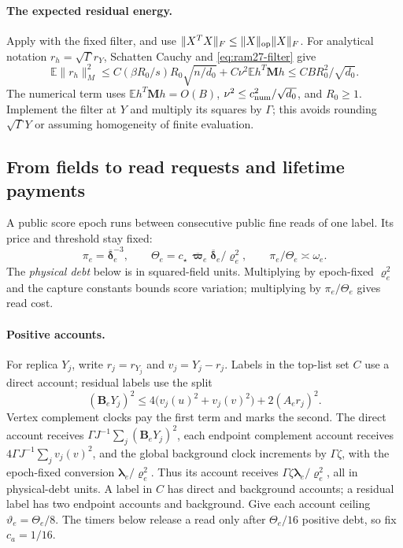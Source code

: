 \documentclass[11pt]{article}
\theoremstyle{remark}
\newcommand{\BB}{\mathbf B}
\newcommand{\llambda}{\boldsymbol{\lambda}}
\newcommand{\vvr}{\boldsymbol{\varrho}}
\newcommand{\vvpbar}{\overline{\boldsymbol{\varpi}}}
\newcommand{\MM}{\mathbf M}
\newcommand{\ddeltabar}{\overline{\boldsymbol{\delta}}}
\newcommand{\Ex}{\mathbb E}
\newcommand{\norm}[1]{\lVert#1\rVert}
\begin{document}
\paragraph{The expected residual energy.}
Apply  with the fixed filter, and use
$\norm{X^TX}_F\le\norm{X}_{\rm op}\norm{X}_F$.
For analytical notation $r_h=\sqrt\Gamma r_Y$, Schatten Cauchy and
\eqref{eq:ram27-filter} give
\begin{equation}\label{eq:ram27-residual-energy}
 \Ex\norm{r_h}_M^2
 \le C(\beta R_0/s)R_0\sqrt{n/d_0}
                   +C\nu^2\Ex h^T\MM h
 \le C B R_0^2/\sqrt{d_0}.
\end{equation}
The numerical term uses $\Ex h^T\MM h=O(B)$, $\nu^2\le c_{\rm num}^2/\sqrt{d_0}$,
and $R_0\ge1$.
Implement the filter at $Y$ and multiply its squares by $\Gamma$; this avoids
rounding $\sqrt\Gamma Y$ or assuming homogeneity of finite evaluation.

\subsection{From fields to read requests and lifetime payments}

A public score epoch runs between consecutive public fine reads of one label.
Its price and threshold stay fixed:
\[
 \pi_e=\ddeltabar_e^{-3},\qquad
 \Theta_e=c_\star\,\vvpbar_e\ddeltabar_e/\vvr_e^2,\qquad
 \pi_e/\Theta_e\asymp\omega_e .
\]
The \emph{physical debt} below is in squared-field units.
Multiplying by epoch-fixed $\vvr_e^2$ and the capture constants bounds score
variation; multiplying by $\pi_e/\Theta_e$ gives read cost.
\paragraph{Positive accounts.} For replica $Y_j$, write $r_j=r_{Y_j}$ and
$v_j=Y_j-r_j$.
Labels in the top-list set $C$ use a direct account; residual labels use the
split
\[
 (\BB_eY_j)^2\le
       4\bigl(v_j(u)^2+v_j(v)^2\bigr)+2(A_er_j)^2 .
\]
Vertex complement clocks pay the first term and marks the second.
The direct account receives $\Gamma J^{-1}\sum_j(\BB_eY_j)^2$, each endpoint
complement account receives $4\Gamma J^{-1}\sum_jv_j(v)^2$, and the global
background clock increments by $\Gamma\zeta$, with the epoch-fixed conversion
$\llambda_e/\vvr_e^2$.
Thus its account receives $\Gamma\zeta\llambda_e/\vvr_e^2$, all in physical-debt
units.
A label in $C$ has direct and background accounts; a residual label has two
endpoint accounts and background.
Give each account ceiling $\vartheta_e=\Theta_e/8$.
The timers below release a read only after $\Theta_e/16$ positive debt, so fix
$c_a=1/16$.
\end{document}
